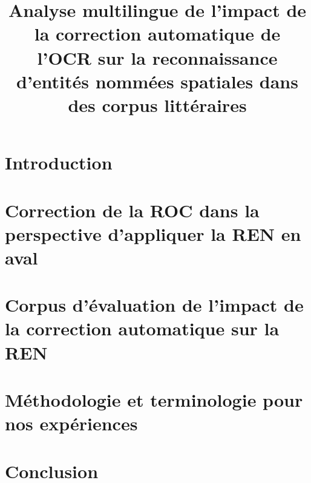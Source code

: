 \documentclass[utf8x]{article-hermes_frenchb}
\title[Contamination des OCR sur la REN]{Analyse multilingue de l'impact de la correction automatique de l'OCR sur la reconnaissance d’entités nommées spatiales dans des corpus littéraires}
\begin{document}
\maketitlepage

\newcommand{\fakesentence}{Attention à ce que les figures et les tableaux ne débordent pas dans les marges. }
\newcommand{\fakeparagraph}{
\fakesentence
\fakesentence
\fakesentence
\fakesentence
\fakesentence
\fakesentence
}

\newcommand{\TAL}{traitement automatique des langues}

\newcommand{\CAD}{c'est-à-dire}
\newcommand{\COLL}{et collègues}
\newcommand{\PEX}{par exemple}
\newcommand{\POPP}{par opposition à}

\newcommand{\cad}{c.-à-d.}
\newcommand{\coll}{et~coll.}
\newcommand{\pex}{p.~ex.}
\newcommand{\popp}{p.~opp.}

\section{Introduction}


\section{Correction de la ROC dans la perspective d'appliquer la REN en aval}

\label{sec:sota}

\section{Corpus d'évaluation de l'impact de la correction automatique sur la REN}
\label{sec:data}


\section{Méthodologie et terminologie pour nos expériences}

\label{sec:Meth}

\label{sec:expe}


%
\section{Conclusion}

\label{sec:concl}



\end{document}

